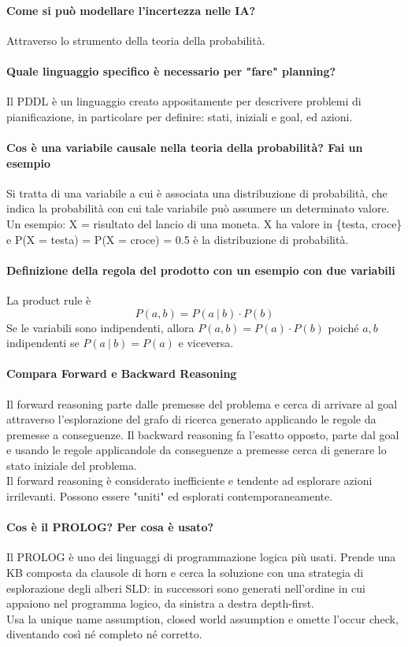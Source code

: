\documentclass[10pt]{report}
\begin{document}
\paragraph{Come si può modellare l'incertezza nelle IA?} Attraverso lo strumento della teoria della probabilità.
\paragraph{Quale linguaggio specifico è necessario per "fare" planning?} Il PDDL è un linguaggio creato appositamente per descrivere problemi di pianificazione, in particolare per definire: stati, iniziali e goal, ed azioni.
\paragraph{Cos è una variabile causale nella teoria della probabilità? Fai un esempio} Si tratta di una variabile a cui è associata una distribuzione di probabilità, che indica la probabilità con cui tale variabile può assumere un determinato valore.\\
Un esempio: X = risultato del lancio di una moneta. X ha valore in \{testa, croce\} e P(X = testa) = P(X = croce) = 0.5 è la distribuzione di probabilità.
\paragraph{Definizione della regola del prodotto con un esempio con due variabili} La product rule è $$P(a,b) = P(a\:|\:b)\cdot P(b)$$
Se le variabili sono indipendenti, allora $P(a,b) = P(a)\cdot P(b)$ poiché $a,b$ indipendenti se $P(a\:|\:b)=P(a)$ e viceversa.
\paragraph{Compara Forward e Backward Reasoning} Il forward reasoning parte dalle premesse del problema e cerca di arrivare al goal attraverso l'esplorazione del grafo di ricerca generato applicando le regole da premesse a conseguenze. Il backward reasoning fa l'esatto opposto, parte dal goal e usando le regole applicandole da conseguenze a premesse cerca di generare lo stato iniziale del problema.\\
Il forward reasoning è considerato inefficiente e tendente ad esplorare azioni irrilevanti. Possono essere "uniti" ed esplorati contemporaneamente.
\paragraph{Cos è il PROLOG? Per cosa è usato?} Il PROLOG è uno dei linguaggi di programmazione logica più usati. Prende una KB composta da clausole di horn e cerca la soluzione con una strategia di esplorazione degli alberi SLD: in successori sono generati nell'ordine in cui appaiono nel programma logico, da sinistra a destra depth-first.\\
Usa la unique name assumption, closed world assumption e omette l'occur check, diventando così né completo né corretto.
\end{document}
